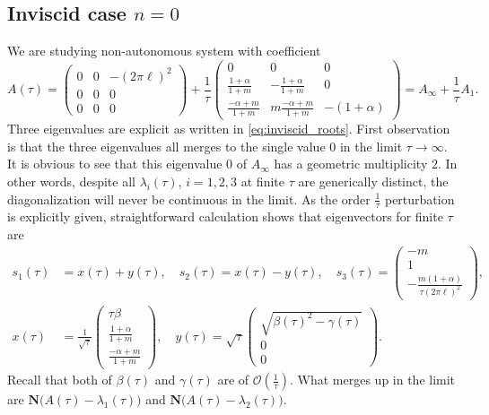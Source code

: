 \documentclass[a4paper,11pt]{article}
\def\l{(2\pi \ell)}
\def\k{(2\pi \ell)}
\theoremstyle{remark}
\begin{document}
\subsection{Inviscid case $n=0$}
We are studying non-autonomous system with coefficient
%   
$$  A(\tau)=\begin{pmatrix}
   0 & 0 & -\l^2\\
   0 & 0 & 0\\
   0 & 0 & 0 
  \end{pmatrix} 
  + \frac{1}{\tau}   \begin{pmatrix}
   0 & 0 & 0\\
   \frac{1+\alpha}{1+m} & -\frac{1+\alpha}{1+m} & 0\\
   \frac{-\alpha+m}{1+m} & m\frac{-\alpha+m}{1+m}& -(1+\alpha)
  \end{pmatrix} = A_\infty + \frac{1}{\tau}A_1.$$
Three eigenvalues are explicit as written in \eqref{eq:inviscid_roots}. First observation is that the three eigenvalues all merges to the single value $0$ in the limit $\tau \rightarrow \infty$. It is obvious to see that this eigenvalue $0$ of $A_\infty$ has a geometric multiplicity $2$. In other words, despite all $\lambda_i(\tau)$, $i=1,2,3$ at finite $\tau$ are generically distinct, the diagonalization will never be continuous in the limit. As the order $\frac{1}{\tau}$ perturbation is explicitly given, straightforward calculation shows that eigenvectors for finite $\tau$ are
\begin{align*}
 s_1(\tau)&=x(\tau) + y(\tau), \quad s_2(\tau)=x(\tau)-y(\tau), \quad s_3(\tau) = \begin{pmatrix} -m\\1\\ -\frac{m(1+\alpha)}{\tau\k^2} \end{pmatrix},\\
 x(\tau) &= \frac{1}{\sqrt{\tau}} \begin{pmatrix} \tau\beta \\ \frac{1+\alpha}{1+m} \\ \frac{-\alpha+m}{1+m} \end{pmatrix}, \quad  y(\tau)= \sqrt{\tau}\begin{pmatrix}  \sqrt{\beta(\tau)^2-\gamma(\tau)}\\0\\0 \end{pmatrix}.
\end{align*}
Recall that both of $\beta(\tau)$ and $\gamma(\tau)$ are of $\mathcal{O}(\frac{1}{\tau})$. What merges up in the limit are $\mathbf{N}\Big(A(\tau) - \lambda_1(\tau)\Big)$ and $\mathbf{N}\Big(A(\tau) - \lambda_2(\tau)\Big)$.
\end{document}
